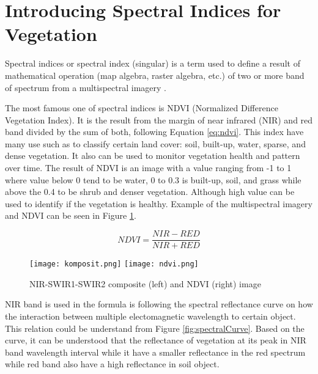 \maketitle

\tableofcontents

\section{Introducing Spectral Indices for Vegetation}
Spectral indices or spectral index (singular) is a term used to define a result of mathematical operation (map algebra, raster algebra, etc.) of two or more band of spectrum from a multispectral imagery \cite{xue2017significant}.

 The most famous one of spectral indices is NDVI (Normalized Difference Vegetation Index). It is the result from the margin of near infrared (NIR) and red band divided by the sum of both, following Equation \ref{eq:ndvi}. This index have many use such as to classify certain land cover: soil, built-up, water, sparse, and dense vegetation. It also can be used to monitor vegetation health and pattern over time. The result of NDVI is an image with a value ranging from -1 to 1 where value below 0 tend to be water, 0 to 0.3 is built-up, soil, and grass while above the 0.4 to be shrub and denser vegetation. Although high value can be used to identify if the vegetation is healthy. Example of the multispectral imagery and NDVI can be seen in Figure \ref{fig:imageNdvi}.

\begin{equation}
	\label{eq:ndvi}
	NDVI = \frac{NIR - RED}{NIR + RED}
\end{equation}

\begin{figure}
	\label{fig:imageNdvi}
	\centering
	\texttt{[image: komposit.png]}
	\texttt{[image: ndvi.png]}
	\caption{NIR-SWIR1-SWIR2 composite (left) and NDVI (right) image}
\end{figure}

NIR band is used in the formula is following the spectral reflectance curve on how the interaction between multiple electomagnetic wavelength to certain object. This relation could be understand from Figure \ref{fig:spectralCurve}. Based on the curve, it can be understood that the reflectance of vegetation at its peak in NIR band wavelength interval while it have a smaller reflectance in the red spectrum while red band also have a high reflectance in soil object.

